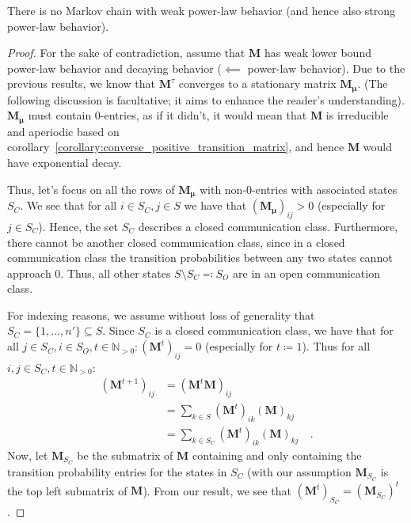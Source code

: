 \documentclass[../../main.tex]{subfiles}
\begin{document}
    \begin{theorem}
        \label{theorem:no_markov_chain_with_power-law_behavior}
        There is no Markov chain with weak power-law behavior (and hence also strong power-law behavior).
    \end{theorem}
    \vspace{-2.5em}
    \begin{proof}
        For the sake of contradiction, assume that $\bm{M}$ has weak lower bound power-law behavior and decaying behavior ($\impliedby$ power-law behavior). Due to the previous results, we know that $\bm{M}^\tau$ converges to a stationary matrix $\bm{M_\mu}$. (The following discussion is facultative; it aims to enhance the reader's understanding). $\bm{M_\mu}$ must contain 0-entries, as if it didn't, it would mean that $\bm{M}$ is irreducible and aperiodic based on corollary~\ref{corollary:converse_positive_transition_matrix}, and hence $\bm{M}$ would have exponential decay.

        Thus, let's focus on all the rows of $\bm{M_\mu}$ with non-0-entries with associated states $S_C$. We see that for all $i \in S_C, j \in S$ we have that $(\bm{M_\mu})_{ij} > 0$ (especially for $j \in S_C$). Hence, the set $S_C$ describes a closed communication class. Furthermore, there cannot be another closed communication class, since in a closed communication class the transition probabilities between any two states cannot approach 0. Thus, all other states $S \setminus S_C \eqqcolon S_O$ are in an open communication class.
        
        For indexing reasons, we assume without loss of generality that $S_C = \{ 1, \dots, n' \} \subseteq S$.
        Since $S_C$ is a closed communication class, we have that for all $j \in S_C, i \in S_O, t \in \mathbb{N}_{>0}: (\bm{M}^t)_{ij} = 0$ (especially for $t \coloneqq 1$). Thus for all $i,j \in S_C, t \in \mathbb{N}_{>0}$:
        \begin{align*}   
            (\bm{M}^{t+1})_{ij} &= (\bm{M}^t \bm{M})_{ij} \\
            &= \sum_{k \in S} (\bm{M}^t)_{ik} (\bm{M})_{kj} \\
            &= \sum_{k \in S_C} (\bm{M}^t)_{ik} (\bm{M})_{kj} \quad .
        \end{align*}
        Now, let $\bm{M}_{S_C}$ be the submatrix of $\bm{M}$ containing and only containing the transition probability entries for the states in $S_C$ (with our assumption $\bm{M}_{S_C}$ is the top left submatrix of $\bm{M}$). From our result, we see that $(\bm{M}^t)_{S_C} = (\bm{M}_{S_C})^t$.


\end{proof}
\end{document}
